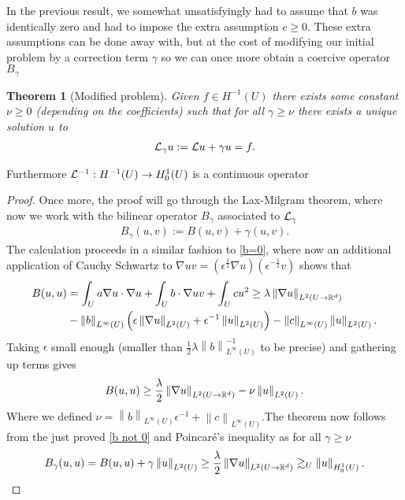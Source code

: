 \documentclass[12pt]{article}
\newtheorem{theorem}{Theorem}
\renewcommand{\norm}[1]{\left\lVert #1 \right\rVert}\renewcommand{\abs}[1]{\left| #1 \right|}
\newcommand{\qt}[1]{\left(#1\right)}
\begin{document}
In the previous result, we somewhat unsatisfyingly had to assume that $ b$ was identically zero and had to impose the extra assumption  $c \geq 0$. These extra assumptions can be done away with, but at the cost of modifying our initial problem by a correction term $\gamma $ so we can once more obtain a coercive operator $B_\gamma $
\begin{theorem}[Modified problem]\label{mod}
  Given $f \in  H^{-1}(U)$ there exists some constant $\nu \geq 0$ (depending on the coefficients) such that for all $\gamma \geq \nu$  there exists a unique solution $u$ to
  \begin{align*}
    \mathcal{L}_\gamma u:= \mathcal{L} u+ \gamma u=f.
  \end{align*}
\end{theorem}
Furthermore $\mathcal{L}^{-1}: H^{-1}(U) \to H^1_0(U)$ is a continuous operator
\begin{proof}
  Once more, the proof will go through the Lax-Milgram theorem, where now we work with the bilinear operator $B_\gamma  $ associated to $\mathcal{L}_\gamma  $
  \begin{align*}
    B_\gamma  (u,v):= B(u,v) + \gamma  (u,v).
  \end{align*}
  The calculation proceeds in a similar fashion to  \eqref{b=0}, where now an additional application of Cauchy Schwartz to $\nabla u v = (\epsilon^{\frac{1}{2}} \nabla u)(\epsilon^{-\frac{1}{2}}v)$  shows that
  \begin{align*}
    B(u,u) & = \int_{U}a \nabla u \cdot \nabla u + \int_{U} b\cdot  \nabla u v +  \int_{U} cu^2 \geq \lambda \norm{\nabla u}_{L^2(U \to \R^d)}           \\
           & - \norm{b}_{L^\infty(U)} \qt{\epsilon \norm{\nabla u}_{L^2(U)}+ \epsilon ^{-1}\norm{u}_{L^2(U)}}- \norm{c}_{L^\infty(U)}\norm{u}_{L^2(U)} .
  \end{align*}
  Taking $\epsilon $ small enough (smaller than $\frac{1}{2} \lambda \norm{b}_{L^\infty(U)}^{-1}$ to be precise) and gathering up terms gives
  \begin{align}\label{b not 0}
    B(u,u) \geq \frac{\lambda}{2} \norm{\nabla u}_{L^2(U \to \R^d)} -\nu \norm{u}_{L^2(U)}.
  \end{align}
  Where we defined $\nu = \norm{b}_{L^\infty(U)} \epsilon ^{-1}+\norm{c}_{L^\infty(U)}$.The theorem now follows from the just proved \eqref{b not 0} and Poincaré's inequality as for all $\gamma \geq \nu$
  \begin{align*}
    B_\gamma (u,u)=B(u,u)+ \gamma \norm{u}_{L^2(U)} \geq\frac{\lambda}{2} \norm{\nabla u}_{L^2(U \to \R^d)}\gtrsim _U \norm{u}_{H_0^1(U)} .
  \end{align*}
\end{proof}
\end{document}
